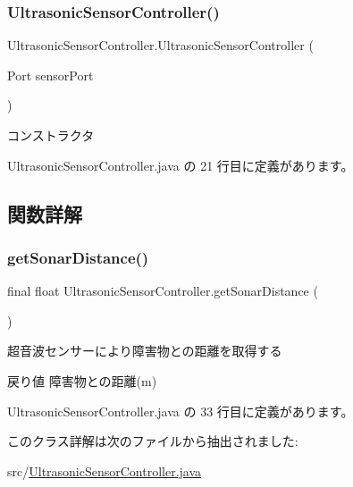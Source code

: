 \subsubsection{\texorpdfstring{UltrasonicSensorController()}{UltrasonicSensorController()}}
{\footnotesize\ttfamily Ultrasonic\+Sensor\+Controller.\+Ultrasonic\+Sensor\+Controller (\begin{DoxyParamCaption}\item[{Port}]{sensor\+Port }\end{DoxyParamCaption})\hspace{0.3cm}{\ttfamily [inline]}}

コンストラクタ 

 Ultrasonic\+Sensor\+Controller.\+java の 21 行目に定義があります。



\subsection{関数詳解}
\mbox{\label{class_ultrasonic_sensor_controller_ac1e9488c4e078022f294a83cc1c7fd70}} 
\subsubsection{\texorpdfstring{getSonarDistance()}{getSonarDistance()}}
{\footnotesize\ttfamily final float Ultrasonic\+Sensor\+Controller.\+get\+Sonar\+Distance (\begin{DoxyParamCaption}{ }\end{DoxyParamCaption})\hspace{0.3cm}{\ttfamily [inline]}}

超音波センサーにより障害物との距離を取得する \begin{DoxyReturn}{戻り値}
障害物との距離(m) 
\end{DoxyReturn}


 Ultrasonic\+Sensor\+Controller.\+java の 33 行目に定義があります。



このクラス詳解は次のファイルから抽出されました\+:\begin{DoxyCompactItemize}
\item 
src/\mbox{\hyperlink{_ultrasonic_sensor_controller_8java}{Ultrasonic\+Sensor\+Controller.\+java}}\end{DoxyCompactItemize}

